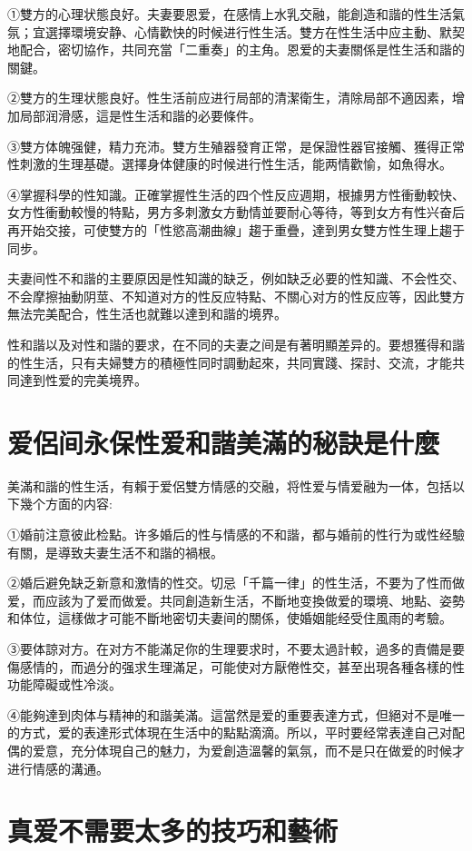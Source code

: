 \documentclass[12pt,UTF8]{ctexbook}
\begin{document}
①雙方的心理状態良好。夫妻要恩爱，在感情上水乳交融，能創造和諧的性生活氣氛；宜選擇環境安静、心情歡快的时候进行性生活。雙方在性生活中应主動、默契地配合，密切協作，共同充當「二重奏」的主角。恩爱的夫妻關係是性生活和諧的關鍵。

②雙方的生理状態良好。性生活前应进行局部的清潔衛生，清除局部不適因素，增加局部润滑感，這是性生活和諧的必要條件。

③雙方体魄强健，精力充沛。雙方生殖器發育正常，是保證性器官接觸、獲得正常性刺激的生理基礎。選擇身体健康的时候进行性生活，能两情歡愉，如魚得水。

④掌握科學的性知識。正確掌握性生活的四个性反应週期，根據男方性衝動較快、女方性衝動較慢的特點，男方多刺激女方動情並要耐心等待，等到女方有性兴奋后再开始交接，可使雙方的「性慾高潮曲線」趨于重疊，達到男女雙方性生理上趨于同步。

夫妻间性不和諧的主要原因是性知識的缺乏，例如缺乏必要的性知識、不会性交、不会摩擦抽動阴莖、不知道对方的性反应特點、不關心对方的性反应等，因此雙方無法完美配合，性生活也就難以達到和諧的境界。

性和諧以及对性和諧的要求，在不同的夫妻之间是有著明顯差异的。要想獲得和諧的性生活，只有夫婦雙方的積極性同时調動起來，共同實踐、探討、交流，才能共同達到性爱的完美境界。

\section{爱侶间永保性爱和諧美滿的秘訣是什麼}

美滿和諧的性生活，有賴于爱侶雙方情感的交融，将性爱与情爱融为一体，包括以下幾个方面的内容:

①婚前注意彼此检點。许多婚后的性与情感的不和諧，都与婚前的性行为或性经驗有關，是導致夫妻生活不和諧的禍根。

②婚后避免缺乏新意和激情的性交。切忌「千篇一律」的性生活，不要为了性而做爱，而应該为了爱而做爱。共同創造新生活，不斷地变換做爱的環境、地點、姿勢和体位，這樣做才可能不斷地密切夫妻间的關係，使婚姻能经受住風雨的考驗。

③要体諒对方。在对方不能滿足你的生理要求时，不要太過計較，過多的責備是要傷感情的，而過分的强求生理滿足，可能使对方厭倦性交，甚至出現各種各樣的性功能障礙或性冷淡。

④能夠達到肉体与精神的和諧美滿。這當然是爱的重要表達方式，但絕对不是唯一的方式，爱的表達形式体現在生活中的點點滴滴。所以，平时要经常表達自己对配偶的爱意，充分体現自己的魅力，为爱創造溫馨的氣氛，而不是只在做爱的时候才进行情感的溝通。

\section{真爱不需要太多的技巧和藝術}
\end{document}
